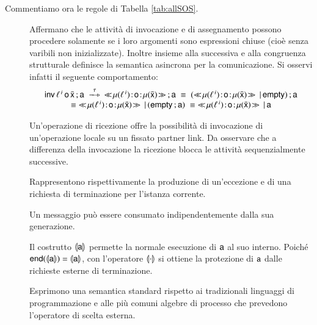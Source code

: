 Commentiamo ora le regole di Tabella \ref{tab:allSOS}.
\begin{description}
  \item[ ] 
  Affermano che le attività di invocazione e di assegnamento
  possono procedere solamente se i loro argomenti sono espressioni
  chiuse (cioè senza varibili non inizializzate). Inoltre  insieme 
  alla successiva  e alla congruenza strutturale
  definisce la semantica asincrona per la comunicazione. Si osservi infatti il
  seguente comportamento:
  $$
  \begin{array}{c}
  	\xinv{\plinv}{\xo}{\bar{\xx}} \xsucc \xs 
  	\; \bpeltsarrow{\xtau} \;
  	\xinstnostate{\xsigma}{\,\xmsg{\xsigma(\plinv)}{\xo}{\xsigma(\bar{\xx})}} \xsucc \xs 
  	\; \xequiv \; 
  	( \xmsg{\xsigma(\plinv)}{\xo}{\xsigma(\bar{\xx})} \xpar \xskip) \xsucc \xs
  	\\ \xequiv \;
  	\xmsg{\xsigma(\plinv)}{\xo}{\xsigma(\bar{\xx})} \xpar (\xskip \xsucc \xs )
  	\; \xequiv \;
  	\xmsg{\xsigma(\plinv)}{\xo}{\xsigma(\bar{\xx})} \xpar \xs 
  \end{array}
  $$
   
  \item[] Un'operazione di ricezione offre la
  possibilità di invocazione di un'operazione locale su un fissato partner
  link. Da osservare che a differenza della invocazione la ricezione blocca le
  attività sequenzialmente successive.
  
  \item[ ] Rappresentono
  rispettivamente la produzione di un'eccezione e di una richiesta di
  terminazione per l'istanza corrente.
  
  \item[] Un messaggio può essere consumato
  indipendentemente dalla sua generazione.
  
  \item[] Il costrutto $\llparenthesis {\sf a}\rrparenthesis$ permette la
  normale esecuzione di ${\sf a}$ al suo interno. Poiché
  ${\sf end}(\llparenthesis {\sf a}\rrparenthesis)=\llparenthesis {\sf a}\rrparenthesis$, con l'operatore $\llparenthesis \cdot\rrparenthesis$ si ottiene
  la protezione di ${\sf a}$ dalle richieste esterne di terminazione.
 
  \item[  
  ] Esprimono una semantica standard rispetto ai
  tradizionali linguaggi di programmazione e alle più comuni algebre di
  processo che prevedono l'operatore di scelta esterna.
  

\end{description}
